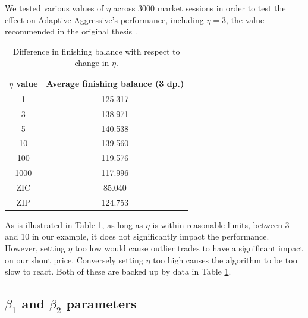 \documentclass[preprint]{acm_proc_article-sp} %
\begin{document}
We tested various values of $\eta$ across 3000 market sessions in
order to test the effect on Adaptive Aggressive's performance, including $\eta
= 3$, the value recommended in the original thesis \cite{AA_thesis}.
\begin{table}[H]
  \centering
  \begin{tabular}{ | c | c | }
    \hline
    \textbf{$\eta$ value} & \textbf{Average finishing balance (3 dp.)} \\
    \hline
        1 & 125.317 \\
        3 & 138.971 \\
        5 & 140.538 \\
        10 &  139.560\\
        100 & 119.576 \\
        1000 & 117.996 \\
    \hline \hline
        ZIC & 85.040 \\
        ZIP & 124.753 \\
    \hline
  \end{tabular}
  \caption{Difference in finishing balance with respect to change in $\eta$.}
  \label{tbl:eta_results}
\end{table}
As is illustrated in Table \ref{tbl:eta_results}, as long as $\eta$ is
within reasonable limits, between 3 and 10 in our example, it does not
significantly impact the performance. However, setting $\eta$ too low would cause outlier trades to have a significant
impact on our shout price. Conversely setting $\eta$ too high causes the
algorithm to be too slow to react. Both of these are backed up by data in Table
\ref{tbl:eta_results}.\\



\subsection{$\beta_1$ and $\beta_2$ parameters} \label{sec:calibration_beta}
\end{document}
